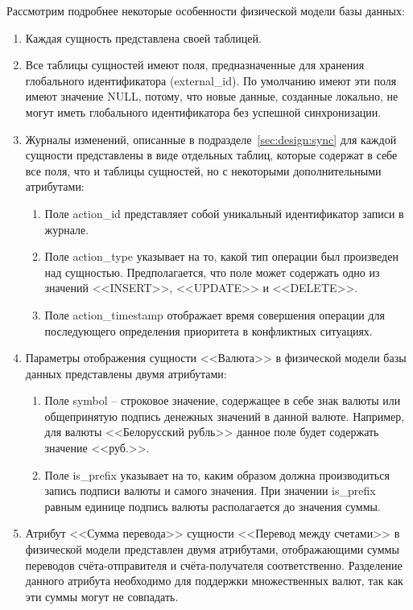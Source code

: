 Рассмотрим подробнее некоторые особенности физической модели базы данных:
\begin{enumerate}
    \item Каждая сущность представлена своей таблицей.
    \item Все таблицы сущностей имеют поля, предназначенные для хранения глобального идентификатора (external\_id).
    По умолчанию имеют эти поля имеют значение NULL, потому, что новые данные, созданные локально, не могут иметь глобального идентификатора без успешной синхронизации.
    \item Журналы изменений, описанные в подразделе~\ref{sec:design:sync} для каждой сущности представлены в виде отдельных таблиц, которые содержат в себе все поля, что и таблицы сущностей, но с некоторыми дополнительными атрибутами:
    \begin{enumerate}
        \item Поле action\_id представляет собой уникальный идентификатор записи в журнале.
        \item Поле action\_type указывает на то, какой тип операции был произведен над сущностью.
        Предполагается, что поле может содержать одно из значений <<INSERT>>, <<UPDATE>> и <<DELETE>>.
        \item Поле action\_timestamp отображает время совершения операции для последующего определения приоритета в конфликтных ситуациях.
    \end{enumerate}
    \item Параметры отображения сущности <<Валюта>> в физической модели базы данных представлены двумя атрибутами:
    \begin{enumerate}
        \item Поле symbol -- строковое значение, содержащее в себе знак валюты или общепринятую подпись денежных значений в данной валюте.
        Например, для валюты <<Белорусский рубль>> данное поле будет содержать значение <<руб.>>.
        \item Поле is\_prefix указывает на то, каким образом должна производиться запись подписи валюты и самого значения.
        При значении is\_prefix равным единице подпись валюты располагается до значения суммы.
    \end{enumerate}
    \item Атрибут <<Сумма перевода>> сущности <<Перевод между счетами>> в физической модели представлен двумя атрибутами, отображающими суммы переводов счёта-отправителя и счёта-получателя соответственно.
    Разделение данного атрибута необходимо для поддержки множественных валют, так как эти суммы могут не совпадать.
\end{enumerate}

